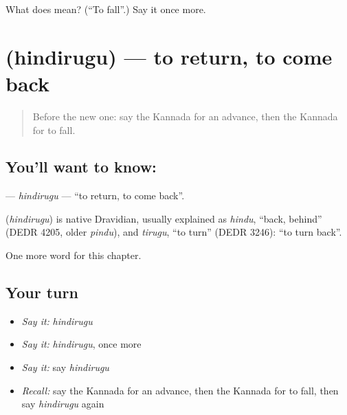 \begin{tcolorbox}[breakable,colback=teal!4,colframe=teal!35!black,title={Before you move on}]
What does  mean? (\textquotedblleft{}To fall\textquotedblright{}.) Say it once more.
\end{tcolorbox}
\section[\texorpdfstring{\kn{ಹಿಂದಿರುಗು} (hindirugu)}{ಹಿಂದಿರುಗು (hindirugu)}]{ (hindirugu) — to return, to come back}

\label{lesson:KA-C235-hindirugu}



\begin{quote}
Before the new one: say the Kannada for an advance, then the Kannada for to fall.
\end{quote}

\subsection*{You'll want to know: }
\textbf{} — \emph{hindirugu} — \textquotedblleft{}to return, to come back\textquotedblright{}.

\begin{cousinweb}
\textbf{} (\emph{hindirugu}) is native Dravidian, usually explained as \emph{hindu}, \textquotedblleft{}back, behind\textquotedblright{} (DEDR 4205, older \emph{pindu}), and \emph{tirugu}, \textquotedblleft{}to turn\textquotedblright{} (DEDR 3246): \textquotedblleft{}to turn back\textquotedblright{}.
\end{cousinweb}

\begin{grammarlens}[title={What you've built}]
One more word for this chapter.
\end{grammarlens}

\subsection*{Your turn}
\begin{itemize}
\raggedright
  \item \emph{Say it:} \emph{hindirugu}
  \item \emph{Say it:} \emph{hindirugu}, once more
  \item \emph{Say it:} say \emph{hindirugu}
  \item \emph{Recall:} say the Kannada for an advance, then the Kannada for to fall, then say \emph{hindirugu} again
\end{itemize}

